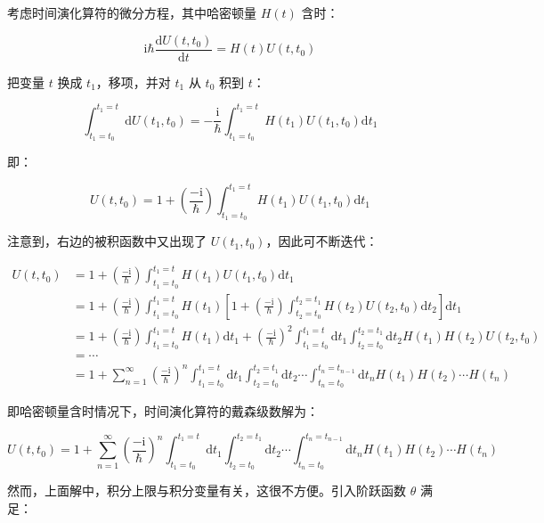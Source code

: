 

考虑时间演化算符的微分方程，其中哈密顿量 $H(t) $ 含时：

$$
\mathrm{i}\hbar\frac{\mathrm{d}U(t,t_0) }{\mathrm{d}t }
=H(t) U(t,t_0) ~
$$

把变量 $t $ 换成 $t_1 $，移项，并对 $t_1 $ 从 $t_0 $ 积到 $t $：

$$
\int_{t_1=t_0}^{t_1=t} \mathrm{d}U(t_1,t_0)
=-\frac{\mathrm{i} }{\hbar } \int_{t_1=t_0}^{t_1=t} H(t_1) U(t_1,t_0)\mathrm{d}t_1~
$$

即：

$$
U(t,t_0)
=1 + \left(\frac{-\mathrm{i} }{\hbar }  \right) \int_{t_1=t_0}^{t_1=t} H(t_1) U(t_1,t_0)\mathrm{d}t_1~
$$

注意到，右边的被积函数中又出现了 $U(t_1,t_0) $，因此可不断迭代：

$$
\begin{aligned}
U(t,t_0)
&=1 + \left(\frac{-\mathrm{i} }{\hbar }  \right) \int_{t_1=t_0}^{t_1=t} H(t_1) U(t_1,t_0)\mathrm{d}t_1 \\
&=1 + \left(\frac{-\mathrm{i} }{\hbar }  \right) \int_{t_1=t_0}^{t_1=t} H(t_1) \left[1 + \left(\frac{-\mathrm{i} }{\hbar }  \right) \int_{t_2=t_0}^{t_2=t_1} H(t_2) U(t_2,t_0)\mathrm{d}t_2 \right]\mathrm{d}t_1 \\
&=1 + \left(\frac{-\mathrm{i} }{\hbar }  \right) \int_{t_1=t_0}^{t_1=t} H(t_1)\mathrm{d}t_1 + \left(\frac{-\mathrm{i} }{\hbar }  \right)^2 \int_{t_1=t_0}^{t_1=t}\mathrm{d}t_1 \int_{t_2=t_0}^{t_2=t_1}\mathrm{d}t_2 H(t_1)H(t_2)U(t_2,t_0) \\
&=\cdots \\
&=1 + \sum_{n=1}^{\infty} \left(\frac{-\mathrm{i} }{\hbar }  \right)^n \int_{t_1=t_0}^{t_1=t}\mathrm{d}t_1 \int_{t_2=t_0}^{t_2=t_1}\mathrm{d}t_2 \cdots \int_{t_n=t_0}^{t_n=t_{n-1}}\mathrm{d}t_n H(t_1)H(t_2) \cdots H(t_n)
\end{aligned}~
$$

即哈密顿量含时情况下，时间演化算符的戴森级数解为：

$$
U(t,t_0)
=1 + \sum_{n=1}^{\infty} \left(\frac{-\mathrm{i} }{\hbar }  \right)^n \int_{t_1=t_0}^{t_1=t}\mathrm{d}t_1 \int_{t_2=t_0}^{t_2=t_1}\mathrm{d}t_2 \cdots \int_{t_n=t_0}^{t_n=t_{n-1}}\mathrm{d}t_n H(t_1)H(t_2) \cdots H(t_n)~
$$

然而，上面解中，积分上限与积分变量有关，这很不方便。引入阶跃函数 $\theta $ 满足：


